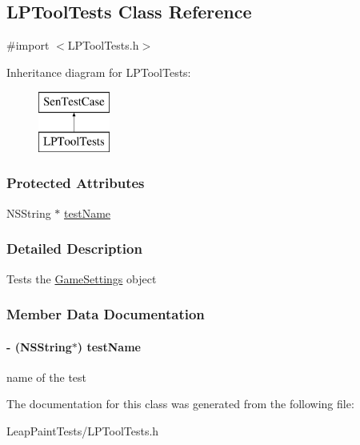 \hypertarget{interface_l_p_tool_tests}{\subsection{L\-P\-Tool\-Tests Class Reference}
\label{d1/d2b/interface_l_p_tool_tests}
}


{\ttfamily \#import $<$L\-P\-Tool\-Tests.\-h$>$}

Inheritance diagram for L\-P\-Tool\-Tests\-:\begin{figure}[H]
\begin{center}
\leavevmode
\includegraphics[height=2.000000cm]{d1/d2b/interface_l_p_tool_tests}
\end{center}
\end{figure}
\subsubsection*{Protected Attributes}
\begin{DoxyCompactItemize}
\item 
N\-S\-String $\ast$ \hyperlink{interface_l_p_tool_tests_a3c6419a5af452250bc25319b2172b6cf}{test\-Name}
\end{DoxyCompactItemize}


\subsubsection{Detailed Description}
Tests the \hyperlink{interface_game_settings}{Game\-Settings} object 

\subsubsection{Member Data Documentation}
\hypertarget{interface_l_p_tool_tests_a3c6419a5af452250bc25319b2172b6cf}{
\paragraph[{test\-Name}]{\setlength{\rightskip}{0pt plus 5cm}-\/ (N\-S\-String$\ast$) test\-Name\hspace{0.3cm}{\ttfamily [protected]}}}\label{d1/d2b/interface_l_p_tool_tests_a3c6419a5af452250bc25319b2172b6cf}
name of the test 

The documentation for this class was generated from the following file\-:\begin{DoxyCompactItemize}
\item 
Leap\-Paint\-Tests/L\-P\-Tool\-Tests.\-h\end{DoxyCompactItemize}
